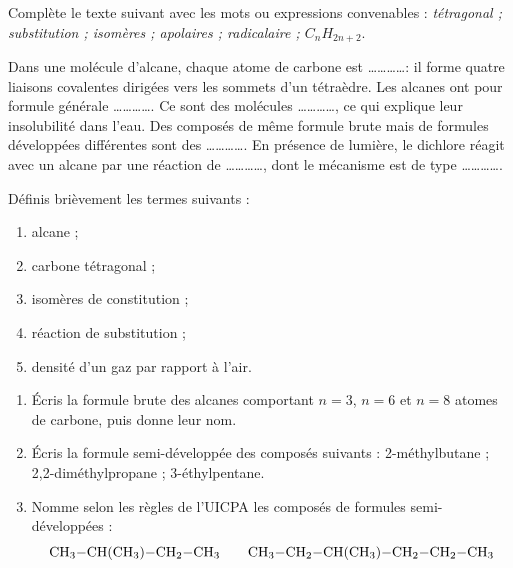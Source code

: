 \documentclass[11pt]{article}
\newcounter{popsec}
\newcounter{popsub}
\newcommand{\courssub}[1]{%
  \stepcounter{popsub}%
  \par\vspace{9pt}\noindent{\popxbold\fontsize{11.5}{13}\selectfont\color{popink}{\color{poporange}\thepopsec.\thepopsub}\hspace{6pt}#1}\par\nopagebreak\vspace{4pt}
}
\begin{document}
\begin{exercice}
Complète le texte suivant avec les mots ou expressions convenables : \emph{tétragonal ; substitution ; isomères ; apolaires ; radicalaire ; $C_nH_{2n+2}$}.

Dans une molécule d'alcane, chaque atome de carbone est \ldots\ldots\ldots\ldots : il forme quatre liaisons covalentes dirigées vers les sommets d'un tétraèdre. Les alcanes ont pour formule générale \ldots\ldots\ldots\ldots. Ce sont des molécules \ldots\ldots\ldots\ldots, ce qui explique leur insolubilité dans l'eau. Des composés de même formule brute mais de formules développées différentes sont des \ldots\ldots\ldots\ldots. En présence de lumière, le dichlore réagit avec un alcane par une réaction de \ldots\ldots\ldots\ldots, dont le mécanisme est de type \ldots\ldots\ldots\ldots.
\end{exercice}

\begin{exercice}[Définitions]
Définis brièvement les termes suivants :
\begin{enumerate}
\item alcane ; \item carbone tétragonal ; \item isomères de constitution ; \item réaction de substitution ; \item densité d'un gaz par rapport à l'air.
\end{enumerate}
\end{exercice}

\courssub{Je m'entraîne}

\begin{exercice}
\begin{enumerate}
\item Écris la formule brute des alcanes comportant $n = 3$, $n = 6$ et $n = 8$ atomes de carbone, puis donne leur nom.
\item Écris la formule semi-développée des composés suivants : 2-méthylbutane ; 2,2-diméthylpropane ; 3-éthylpentane.
\item Nomme selon les règles de l'UICPA les composés de formules semi-développées :
\[\ce{CH3-CH(CH3)-CH2-CH3} \qquad \ce{CH3-CH2-CH(CH3)-CH2-CH2-CH3}\]
\end{enumerate}
\end{exercice}
\end{document}

